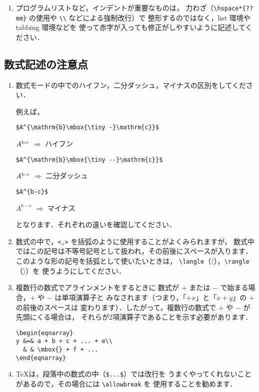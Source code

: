 \documentclass[paper]{jrsj}    %
\begin{document}
\begin{enumerate}
\item
プログラムリストなど，インデントが重要なものは，
力わざ（\verb/\hspace*{??mm}/ の使用や \verb/\\/ などによる強制改行）で
整形するのではなく，{\ttfamily list} 環境や {\ttfamily tabbing} 環境などを
使って赤字が入っても修正がしやすいように記述してください．
\end{enumerate}

\subsection{数式記述の注意点}\label{sec:eq1}

\begin{enumerate}
\item
数式モードの中でのハイフン，二分ダッシュ，マイナスの区別をしてください．\par
例えば，\par
\verb/$A^{\mathrm{b}\mbox{\tiny -}\mathrm{c}}$/\par
\hspace{2zw}$A^{\mathrm{b}\mbox{\tiny -}\mathrm{c}}$
 $\Rightarrow$ ハイフン\par
\verb/$A^{\mathrm{b}\mbox{\tiny --}\mathrm{c}}$/\par
\hspace{2zw}$A^{\mathrm{b}\mbox{\tiny --}\mathrm{c}}$
 $\Rightarrow$ 二分ダッシュ\par
\verb/$A^{b-c}$/\par
\hspace{2zw}$A^{b-c}$ $\Rightarrow$ マイナス\par
となります．それぞれの違いを確認してください．\par

\item
数式の中で，\verb/<,>/ を括弧のように使用することがよくみられますが，
数式中ではこの記号は不等号記号として扱われ，その前後にスペースが入ります．
このような形の記号を括弧として使いたいときは，
\verb/\langle/（$\langle$），\verb/\rangle/（$\rangle$）を
使うようにしてください．

\item
複数行の数式でアラインメントをするときに
数式が $+$ または $-$ で始まる場合，$+$ や $-$ は単項演算子と
みなされます（つまり，「$+x$」と「$x+y$」の $+$ の前後のスペースは
変わります）．したがって，複数行の数式で $+$ や $-$ が先頭にくる場合は，
それらが2項演算子であることを示す必要があります\cite{latex}．
\begin{verbatim}
\begin{eqnarray}
y &=& a + b + c + ... + e\\
  & & \mbox{} + f + ... 
\end{eqnarray}
\end{verbatim}

\item
\TeX{}は，段落中の数式の中（\verb/$...$/）では改行を
うまくやってくれないことがあるので，その場合には \verb/\allowbreak/ を
使用することを勧めます\cite{Abrahams}．
\end{enumerate}
\end{document}
